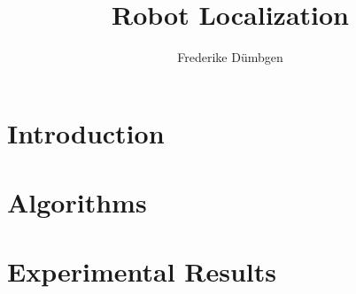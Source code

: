 \documentclass[a4paper]{./pset}
\title{Robot Localization}
\author{Frederike Dümbgen}
\begin{document}
\maketitle

\section{Introduction}


\section{Algorithms}


\section{Experimental Results}



\label{Bibliography}

\begingroup
    \raggedright
    \sloppy
\endgroup 
\end{document}
